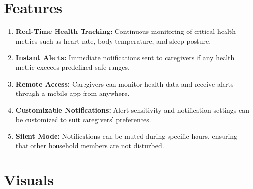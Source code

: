 \documentclass[12pt,a4paper]{report}
\begin{document}
\section{Features}
\begin{enumerate}
  \item \textbf{Real-Time Health Tracking:} Continuous monitoring of critical health metrics such as heart rate, body temperature, and sleep posture.
  \item \textbf{Instant Alerts:} Immediate notifications sent to caregivers if any health metric exceeds predefined safe ranges.
  \item \textbf{Remote Access:} Caregivers can monitor health data and receive alerts through a mobile app from anywhere.
  \item \textbf{Customizable Notifications:} Alert sensitivity and notification settings can be customized to suit caregivers' preferences.
  \item \textbf{Silent Mode:} Notifications can be muted during specific hours, ensuring that other household members are not disturbed.
\end{enumerate}

\section{Visuals}
\end{document}
